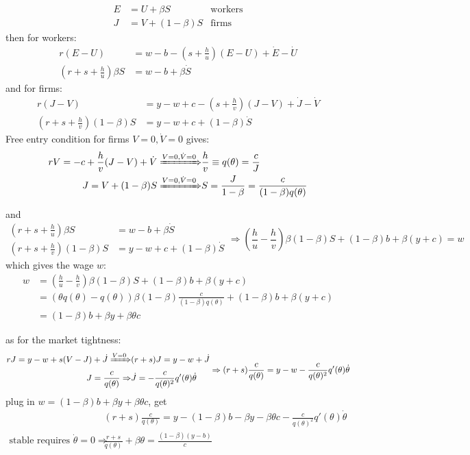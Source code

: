 \documentclass[10pt,landscape,a4paper]{article}
\begin{document}
\begin{multicols*}{3}
\begin{align*}
    E &= U + \beta S & \text{workers}\\
    J &= V + (1-\beta) S & \text{firms}
\end{align*}
then for workers:
\begin{align*}
    r(E-U) &= w-b - \left(s+\frac{h}{u}\right)(E-U)+\dot{E}-\dot{U}\\
    \left(r+s+\frac{h}{u}\right)\beta S &= w-b + \beta\dot{S}
\end{align*}
and for firms:
\begin{align*}
    r(J-V) &= y-w+c - \left(s+\frac{h}{v}\right)(J-V)+\dot{J}-\dot{V}\\
    \left(r+s+\frac{h}{v}\right)(1-\beta) S &= y-w+c + (1-\beta)\dot{S}
\end{align*}
Free entry condition for firms $V=0,\dot{V}=0$ gives:
\begin{align*}
    rV=-c+\frac{h}{v}(J-V)+\dot{V}\xRightarrow{V=0,\dot{V}=0} &\frac{h}{v} \equiv q(\theta) = \frac{c}{J}\\
    J=V+(1-\beta)S \xRightarrow{V=0,\dot{V}=0} & S=\frac{J}{1-\beta} = \frac{c}{(1-\beta)q(\theta)}
\end{align*}

and
$$
\begin{aligned}
    \left(r+s+\frac{h}{u}\right)\beta S &= w-b + \beta\dot{S}\\
    \left(r+s+\frac{h}{v}\right)(1-\beta) S &= y-w+c + (1-\beta)\dot{S}
\end{aligned} \Rightarrow \left(\frac{h}{u}-\frac{h}{v}\right)\beta(1-\beta)S+(1-\beta)b+\beta(y+c)=w
$$
which gives the wage $w$:
\begin{align*}
    w&=\left(\frac{h}{u}-\frac{h}{v}\right)\beta(1-\beta)S+(1-\beta)b+\beta(y+c)\\
    &=(\theta q(\theta)-q(\theta))\beta(1-\beta)\frac{c}{(1-\beta)q(\theta)} + (1-\beta)b+\beta(y+c)\\
    &= (1-\beta)b+\beta y+\beta\theta c
\end{align*}

as for the market tightness:
$$
\begin{aligned}
    rJ=y-w+s(V-J)+\dot{J}\xRightarrow{V=0}& (r+s)J=y-w+\dot{J}\\
    J = \frac{c}{q(\theta)}\Rightarrow& \dot{J}=-\frac{c}{q(\theta)^2}q'(\theta)\dot{\theta}
\end{aligned}\Rightarrow (r+s)\frac{c}{q(\theta)}=y-w-\frac{c}{q(\theta)^2}q'(\theta)\dot{\theta}
$$
plug in $w=(1-\beta)b+\beta y+\beta\theta c$, get
\begin{align*}
    & (r+s)\frac{c}{q(\theta)} = y- (1-\beta)b-\beta y-\beta\theta c-\frac{c}{q(\theta)^2}q'(\theta)\dot{\theta}\\
    \text{stable requires }\dot{\theta}=0 \Rightarrow & \frac{r+s}{q(\theta)}+\beta\theta = \frac{(1-\beta)(y-b)}{c}
\end{align*}


\end{multicols*}
\end{document}
